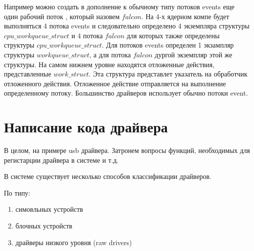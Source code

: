 Например можно создать в дополнение к обычному типу потоков events еще один рабочий поток , который назовем $falcon$. На 4-х ядерном компе будет выполняться 4 потока events и следовательно определено 4 экземпляра структуры $cpu\_workqueue\_struct$ и 4 потока $falcon$   для которых также определены структуры  $cpu\_workqueue\_struct$. Для потоков events определен 1 экзампляр структуры $workqueue\_struct$, а для потока $falcon$ дургой экземпляр этой же структуры. 
На самом нижнем уровне находятся отложенные действия, представленные $work\_struct$. Эта структура представлет указатель на обработчик отложенного действия. Отложенное действие отправляется на выполнение определенному потоку. Большинство драйверов использует обычно потоки event.

\chapter{Написание кода драйвера}
В целом, на примере usb драйвера. Затронем вопросы функций, необходимых для регистарции драйвера в системе и т.д.

В системе существует несколько способов классификации драйверов.

По типу:
\begin{enumerate}
	\item симовльных устройств
	\item блочных устройств
	\item драйверы низкого уровня (raw drivers)
\end{enumerate}

